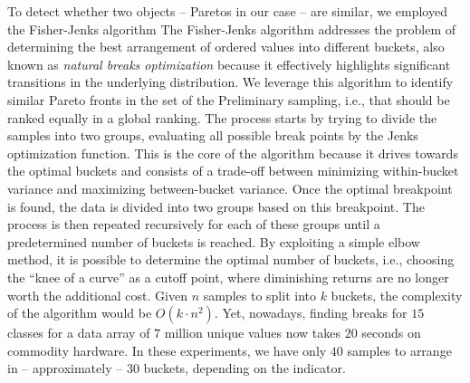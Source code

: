 To detect whether two objects -- Paretos in our case -- are similar, we employed the Fisher-Jenks algorithm \cite{fisher1958homogeneity, jenks1967data}
The Fisher-Jenks algorithm addresses the problem of determining the best arrangement of ordered values into different buckets, also known as \textit{natural breaks optimization} because it effectively highlights significant transitions in the underlying distribution.
We leverage this algorithm to identify similar Pareto fronts in the set of the Preliminary sampling, i.e., that should be ranked equally in a global ranking. The process starts by trying to divide the samples into two groups, evaluating all possible break points by the Jenks optimization function. This is the core of the algorithm because it drives towards the optimal buckets and consists of a trade-off between minimizing within-bucket variance and maximizing between-bucket variance.
Once the optimal breakpoint is found, the data is divided into two groups based on this breakpoint.
The process is then repeated recursively for each of these groups until a predetermined number of buckets is reached. By exploiting a simple elbow method, it is possible to determine the optimal number of buckets, i.e., choosing the ``knee of a curve'' as a cutoff point, where diminishing returns are no longer worth the additional cost.
Given $n$ samples to split into $k$ buckets, the complexity of the algorithm would be $O(k \cdot n^2)$. Yet, nowadays, finding breaks for $15$ classes for a data array of $7$ million unique values now takes $20$ seconds on commodity hardware. In these experiments, we have only $40$ samples to arrange in -- approximately -- $30$ buckets, depending on the indicator.



